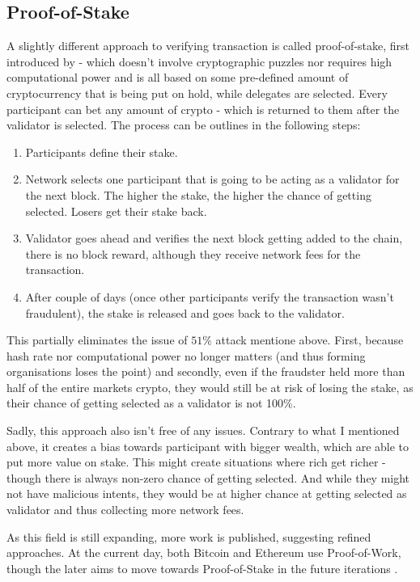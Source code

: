 \subsection{Proof-of-Stake}
A slightly different approach to verifying transaction is called proof-of-stake, first introduced by \cite{king2012ppcoin} - which doesn't involve cryptographic puzzles nor requires high computational power and is all based on some pre-defined amount of cryptocurrency that is being put on hold, while delegates are selected. Every participant can bet any amount of crypto - which is returned to them after the validator is selected. The process can be outlines in the following steps:
\begin{enumerate}
    \item Participants define their stake.
    \item Network selects one participant that is going to be acting as a validator for the next block. The higher the stake, the higher the chance of getting selected. Losers get their stake back.
    \item Validator goes ahead and verifies the next block getting added to the chain, there is no block reward, although they receive network fees for the transaction.
    \item After couple of days (once other participants verify the transaction wasn't fraudulent), the stake is released and goes back to the validator.
\end{enumerate}
This partially eliminates the issue of $51\%$ attack mentione above. First, because hash rate nor computational power no longer matters (and thus forming organisations loses the point) and secondly, even if the fraudster held more than half of the entire markets crypto, they would still be at risk of losing the stake, as their chance of getting selected as a validator is not 100\%.

Sadly, this approach also isn't free of any issues. Contrary to what I mentioned above, it creates a bias towards participant with bigger wealth, which are able to put more value on stake. This might create situations where rich get richer - though there is always non-zero chance of getting selected. And while they might not have malicious intents, they would be at higher chance at getting selected as validator and thus collecting more network fees.

As this field is still expanding, more work is published, suggesting refined approaches. At the current day, both Bitcoin and Ethereum use Proof-of-Work, though the later aims to move towards Proof-of-Stake in the future iterations \cite{saleh2020blockchain}.
